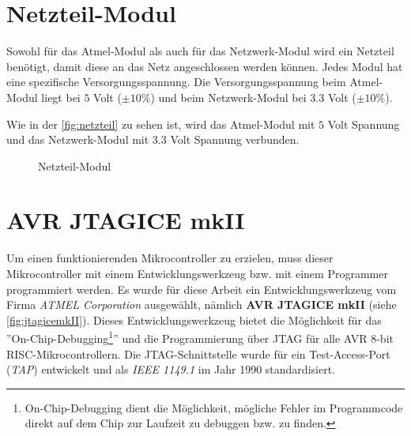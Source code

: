 \section{Netzteil-Modul}

Sowohl für das Atmel-Modul als auch für das Netzwerk-Modul wird ein Netzteil benötigt, damit diese an das Netz angeschlossen werden können. Jedes Modul hat eine spezifische Versorgungsspannung. Die Versorgungsspannung beim Atmel-Modul liegt bei $5$ Volt ($\pm 10 \%$) und beim Netzwerk-Modul bei $3.3$ Volt ($\pm 10 \%$). \smallskip \smallskip

Wie in der \autoref{fig:netzteil} zu sehen ist, wird das Atmel-Modul mit $5$ Volt Spannung und das Netzwerk-Modul mit $3.3$ Volt Spannung verbunden.

\begin{figure}[htbp]
	\centering
	\caption{Netzteil-Modul}\label{fig:netzteil}
\end{figure}

\section{AVR JTAGICE mkII}\label{sec:atmel:jtag}

Um einen funktionierenden Mikrocontroller zu erzielen, muss dieser Mikrocontroller mit einem Entwicklungswerkzeug bzw. mit einem Programmer programmiert werden. Es wurde für diese Arbeit ein Entwicklungswerkzeug vom Firma \textit{ATMEL Corporation} ausgewählt, nämlich \textbf{AVR JTAGICE mkII} \cite{Mikrocontroller:JTAGICEmkII} (siehe \autoref{fig:jtagicemkII}). Dieses Entwicklungswerkzeug bietet die Möglichkeit für das ''On-Chip-Debugging\footnote{On-Chip-Debugging dient die Möglichkeit, mögliche Fehler im Programmcode direkt auf dem Chip zur Laufzeit zu debuggen bzw. zu finden.}'' und die Programmierung über JTAG für alle AVR 8-bit RISC-Mikrocontrollern. Die JTAG-Schnittstelle wurde für ein Test-Access-Port (\textit{TAP}) entwickelt und als \textit{IEEE 1149.1} im Jahr 1990 standardisiert. 

